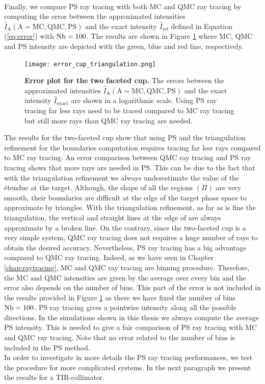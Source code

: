 \\ \indent 
Finally, we compare PS ray tracing with both MC and QMC ray tracing by computing the error between the approximated intensities $\hat{I}_{\textrm{A}}  (\textrm{A}= \textrm{MC}, \textrm{QMC}, \textrm{PS})$ and the exact intensity $\hat{I}_{\textrm{ref}}$ defined in Equation (\ref{eq:error}) with $\textrm{Nb} = 100$. The results are shown in Figure \ref{fig:error_cup_triangulation} where MC, QMC and PS intensity are depicted with the green, blue and red line, respectively.
 \begin{figure}[h]
  \center
  \texttt{[image: error\_cup\_triangulation.png]}
  \caption{\textbf{Error plot for the two faceted cup.} The errors between the approximated intensities $\hat{I}_{\textrm{A}} (\textrm{A}= \textrm{MC}, \textrm{QMC}, \textrm{PS})$ and the exact intensity $\hat{I}_{\textrm{exact}}$ are shown in a logarithmic scale. Using PS ray tracing far less rays need to be traced compared to MC ray tracing but still more rays than QMC ray tracing are needed.}
  \label{fig:error_cup_triangulation}
\end{figure}
The results for the two-faceted cup show that using PS and the triangulation refinement for the boundaries computation requires tracing far less rays compared to MC ray tracing.
An error comparison between QMC ray tracing and PS ray tracing shows that more rays are needed in PS. This can be due to the fact that with the triangulation refinement we always underestimate the value of the \'{e}tendue at the target. Although, the shape of all the regions $(\Pi)$ are very smooth, their boundaries are difficult at the edge of the target phase space  to approximate by triangles. With the triangulation refinement, as far as is fine the triangulation, the vertical and straight lines at the edge of  are always approximate by a broken line. On the contrary, since the two-faceted cup is a very simple system, QMC ray tracing does not requires a huge number of rays to obtain the desired accuracy. Nevertheless, PS ray tracing has a big advantage compared to QMC ray tracing. Indeed, as we have seen in Chapter \ref{chap:raytracing}, MC and QMC ray tracing are binning procedure. Therefore, the MC and QMC intensities are given by the average over every bin and the error also depends on the number of bins. This part of the error is not included in the results provided in Figure \ref{fig:error_cup_triangulation} as there we have fixed the number of bins $\textrm{Nb} = 100$. %
PS ray tracing gives a pointwise intensity along all the possible directions. In the simulations shown in this thesis we always compute the average PS intensity. This is needed to give a fair comparison of PS ray tracing with MC and QMC ray tracing. Note that no error related to the number of bins is included in the PS method. \\ \indent
In order to investigate in more details the PS ray tracing performances, we test the procedure for more complicated systems. In the next paragraph we present the results for a TIR-collimator. 
